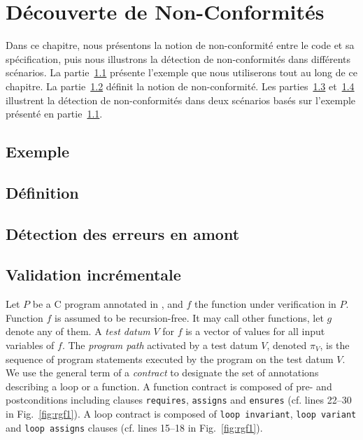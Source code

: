 
\chapter{Découverte de Non-Conformités}
\label{sec:ncd}

\chapterintro

Dans ce chapitre, nous présentons la notion de non-conformité entre le code et
sa spécification, puis nous illustrons la détection de non-conformités dans
différents scénarios.
La partie~\ref{sec:ncd-ex} présente l'exemple que nous utiliserons tout au long
de ce chapitre.
La partie~\ref{sec:ncd-def} définit la notion de non-conformité.
Les parties~\ref{sec:ncd-early} et~\ref{sec:ncd-incr} illustrent la détection
de non-conformités dans deux scénarios basés sur l'exemple présenté en
partie~\ref{sec:ncd-ex}.


\section{Exemple}
\label{sec:ncd-ex}


\section{Définition}
\label{sec:ncd-def}


\section{Détection des erreurs en amont}
\label{sec:ncd-early}


\section{Validation incrémentale}
\label{sec:ncd-incr}


Let $P$ be a C program annotated in \eacsl, 
and $f$ the function under verification in $P$.
Function $f$ is assumed to be recursion-free.
It may call other functions, let $g$ denote any of them.
A \emph{test datum} $V$ for $f$ is a vector of values for all input variables of $f$.
The \emph{program path} activated by a test datum $V$, denoted $\pi_V$,  is the sequence of program statements
executed by the program on the test datum $V$.
We use the general term of a \emph{contract} 
to designate the set of \eacsl annotations describing a loop or a function.
A function contract is composed of pre- and postconditions including \eacsl clauses
\lstinline{requires}, \lstinline{assigns} and
\lstinline{ensures}  (cf. lines 22--30 in Fig.~\ref{fig:rgf1}).
A loop contract is composed of \lstinline{loop invariant},
\lstinline{loop variant} and \lstinline{loop assigns} clauses
(cf. lines 15--18 in Fig.~\ref{fig:rgf1}).

